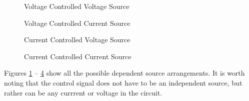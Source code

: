 \documentclass{handout}
\begin{document}
\newpage
\clearpage
\pagebreak 

\begin{figure} [h! t! b!]
\centering
{}
\caption{Voltage Controlled Voltage Source}
\label{fig: VCVS}
\end{figure}

\begin{figure} [h! t! b!]
\centering
{}
\caption{Voltage Controlled Current Source}
\label{fig: VCCS}
\end{figure}

\begin{figure} [h! t! b!]
\centering
{}
\caption{Current Controlled Voltage Source}
\label{fig: CCVS}
\end{figure}

\begin{figure} [h! t! b!]
\centering
{}
\caption{Current Controlled Current Source}
\label{fig: CCCS}
\end{figure}

Figures \ref{fig: VCVS} -- \ref{fig: CCCS} show all the possible dependent source arrangements. It is worth noting that the control signal does not have to be an independent source, but rather can be any currrent or voltage in the circuit.
\end{document}
